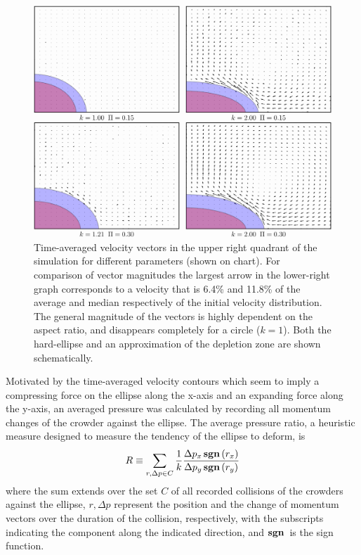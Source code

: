 \begin{figure}
\includegraphics[width=15cm]{tex/entropic_flow_paper/FIG3_fourvelocity.jpg}
\caption{Time-averaged velocity vectors in the upper right quadrant of the simulation for different parameters (shown on chart). For comparison of vector magnitudes the largest arrow in the lower-right graph corresponds to a velocity that is 6.4\% and 11.8\% of the average and median respectively of the initial velocity distribution. The general magnitude of the vectors is highly dependent on the aspect ratio, and disappears completely for a circle ($k=1$). Both the hard-ellipse and an approximation of the depletion zone are shown schematically. }
\label{fig:velocity_plot}
\end{figure}

Motivated by the time-averaged velocity contours which seem to imply a compressing force on the ellipse along the x-axis and an expanding force along the y-axis, an averaged pressure was calculated by recording all momentum changes of the crowder against the ellipse. The average pressure ratio, a heuristic measure designed to measure the tendency of the ellipse to deform, is
%
\begin{equation}
R \equiv \sum_{r,\Delta p \in C}{ \frac{1}{k} \frac{{ \Delta p_x \operatorname*{\mathbf{sgn}\,}(r_x) }}{{\Delta p_y \operatorname*{\mathbf{sgn}\,}(r_y) } } }
\end{equation}
%
where the sum extends over the set $C$ of all recorded collisions of the crowders against the ellipse, $r,\Delta p$ represent the  position and the change of momentum vectors over the duration of the collision, respectively, with the subscripts indicating the component along the indicated direction, and $\operatorname*{\mathbf{sgn}\,}$ is the sign function.

